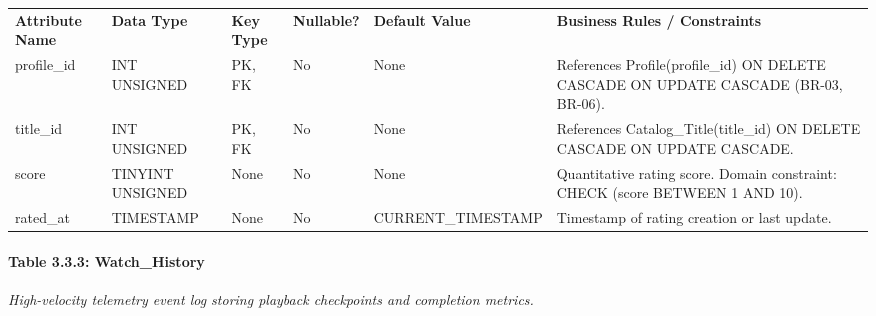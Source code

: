 {\def\LTcaptype{none} %
\begin{longtable}[]{@{}
  >{\raggedright\arraybackslash}p{}
  >{\raggedright\arraybackslash}p{}
  >{\raggedright\arraybackslash}p{}
  >{\raggedright\arraybackslash}p{}
  >{\raggedright\arraybackslash}p{}
  >{\raggedright\arraybackslash}p{}@{}}
\arrayrulecolor{black}\toprule\noalign{}
\endhead
\bottomrule\noalign{}
\endlastfoot
\textbf{Attribute Name} & \textbf{Data Type} & \textbf{Key Type} & \textbf{Nullable?} & \textbf{Default Value} & \textbf{Business Rules / Constraints} \\ \arrayrulecolor{black}\midrule
profile\_\allowbreak{}id & INT UNSIGNED & PK, FK & No & None & References Profile(profile\_\allowbreak{}id) ON DELETE CASCADE ON UPDATE CASCADE (BR-03, BR-06). \\ \arrayrulecolor{black!20}\midrule
title\_\allowbreak{}id & INT UNSIGNED & PK, FK & No & None & References Catalog\_\allowbreak{}Title(title\_\allowbreak{}id) ON DELETE CASCADE ON UPDATE CASCADE. \\ \arrayrulecolor{black!20}\midrule
score & TINYINT UNSIGNED & None & No & None & Quantitative rating score. Domain constraint: CHECK (score BETWEEN 1 AND 10). \\ \arrayrulecolor{black!20}\midrule
rated\_\allowbreak{}at & TIMESTAMP & None & No & CURRENT\_\allowbreak{}TIMESTAMP & Timestamp of rating creation or last update. \\
\end{longtable}
}

\paragraph{Table 3.3.3: Watch\_\allowbreak{}History}\label{table-3.3.3-watch_history}

\emph{High-velocity telemetry event log storing playback checkpoints and completion metrics.}

